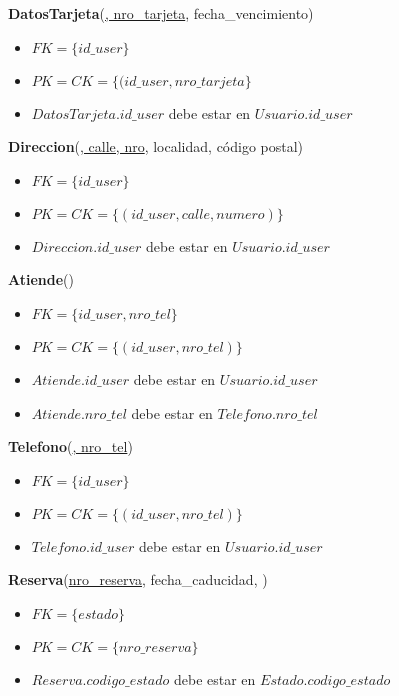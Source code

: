 \vspace*{0.1cm}
\noindent
\textbf{DatosTarjeta}(\underline{, nro\_tarjeta}, fecha\_vencimiento)
\begin{itemize}[noitemsep]
	\item $FK = \{id\_user\}$
	\item $PK = CK = \{(id\_user, nro\_tarjeta\}$
	\item $DatosTarjeta.id\_user$ debe estar en $Usuario.id\_user$
\end{itemize}

\vspace*{0.1cm}
\noindent
\textbf{Direccion}(\underline{, calle, nro}, 
					localidad, código postal)
\begin{itemize}[noitemsep]
	\item $FK = \{id\_user\}$
	\item $PK = CK = \{(id\_user, calle, numero)\}$
	\item $Direccion.id\_user$ debe estar en $Usuario.id\_user$
\end{itemize}

\vspace*{0.1cm}
\noindent
\textbf{Atiende}(\underline{})
\begin{itemize}[noitemsep]
	\item $FK = \{id\_user, nro\_tel\}$
	\item $PK = CK = \{(id\_user, nro\_tel)\}$
	\item $Atiende.id\_user$ debe estar en $Usuario.id\_user$
	\item $Atiende.nro\_tel$ debe estar en $Telefono.nro\_tel$
\end{itemize}

\newpage
\noindent
\textbf{Telefono}(\underline{, nro\_tel})
\begin{itemize}[noitemsep]
	\item $FK = \{id\_user\}$
	\item $PK = CK = \{(id\_user, nro\_tel)\}$
	\item $Telefono.id\_user$ debe estar en $Usuario.id\_user$
\end{itemize}


\vspace*{0.1cm}
\noindent
\textbf{Reserva}(\underline{nro\_reserva}, fecha\_caducidad, )
\begin{itemize}[noitemsep]
	\item $FK = \{estado\}$
	\item $PK = CK = \{nro\_reserva\}$
	\item $Reserva.codigo\_estado$ debe estar en $Estado.codigo\_estado$
\end{itemize}


